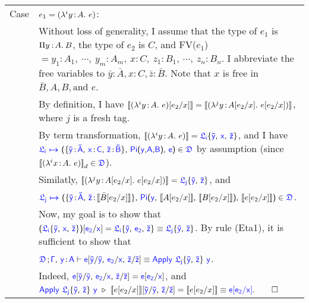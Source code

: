 \begin{longtable}{p{0.05\linewidth} p{0.95\linewidth}}
Case & $e_1 = (\lambda^{i}y\hspace{0.5mm}{:}\hspace{0.5mm} A.\ e)$:\\
& Without loss of generality, I assume that the type of $e_1$ is $\Pi y\mkern1.5mu{\hspace{0.5mm}{:}\hspace{0.5mm}} A.\hspace{0.8mm}B$, the type of $e_2$ is $C$, and FV($e_1$) $ =y_1 : A_1,\ \cdots,\ y_m : A_m,\ x : C,\ z_1 : B_1,\ \cdots,\ z_n : B_n$.
I abbreviate the free variables to $\bar{y} : \bar{A}, x : C , \bar{z} : \bar{B}$. Note that $x$ is free in $\bar{B}, A, B, \text{and } e$.
\\
& By definition, I have ${[\![ (\lambda^{i}y\hspace{0.5mm}{:}\hspace{0.5mm} A.\ e)[e_2\slash x] ]\!]} = {[\![ (\lambda^{j}y\hspace{0.5mm}{:}\hspace{0.5mm} A[e_2\slash x].\ e[e_2\slash x]) ]\!]}$, where $j$  is a fresh tag.\\
& By term transformation, $\bbracket{(\lami{i}{y}{A}{e})} = 
\target{\flabel_i}\{\target{\bar{y}} \sfcomma \target{x} \sfcomma \target{\bar{z}}\}$, and I have 
$\itemdef{\target{\flabel_i}}
{\itemtype{\bar{y}}{\bar{A}} \sfcomma \itemtype{x}{C} \sfcomma \itemtype{\bar{z}}{\bar{B}}}
{\targetpi{y}{A}{B}}{\target{e}} \in \target{\fdef}$ by assumption (since $\bbracket{(\lami{i}{x}{A}{e})}_d \in \target{\fdef}$).\\
& Similatly, $\bbracket{(\lami{j}{y}{A\sub{e_2}{x}}{e\sub{e_2}{x}})} = 
\target{\flabel_j}\{\target{\bar{y}} \sfcomma \target{\bar{z}}\}$, and\\ 
&  $\itemdef{\target{\flabel_j}}
{\itemtype{\bar{y}}{\bar{A}} \sfcomma \target{\bar{z}} \goodcolon \bbracket{\bar{B}\sub{e_2}{x}}}
{\target{Pi} \sfpl \target{y} \sfcomma \bbracket{{A}\sub{e_2}{x}} \sfcomma \bbracket{{B}\sub{e_2}{x}} \sfpr}
{\bbracket{{e}\sub{e_2}{x}}} \in \target{\fdef}$.\\
& Now, my goal is to show that 
$\sfpl \target{\flabel_i}\{\target{\bar{y}} \sfcomma \target{x} \sfcomma \target{\bar{z}}\} \sfpr \sub{\target{e_2}}{\target{x}} = \target{\flabel_i}\{\target{\bar{y}} \sfcomma \target{e_2} \sfcomma \target{\bar{z}}\} \equiv
\target{\flabel_j}\{\target{\bar{y}} \sfcomma \target{\bar{z}}\}$. By rule (Eta1), it is sufficient to show that\\
& $\targetcon \sfcomma \target{y} \goodcolon \target{A} \vdash 
\target{e}[\target{\bar{y}}\slash\target{\bar{y}} \sfcomma \target{e_2}\slash\target{x} \sfcomma \target{\bar{z}}\slash\target{\bar{z}}]
\equiv \target{Apply}\ \target{\flabel_j}\{\target{\bar{y}} \sfcomma \target{\bar{z}}\} \ \target{y}$.\\
& Indeed, $\target{e}[\target{\bar{y}}\slash\target{\bar{y}} \sfcomma \target{e_2}\slash\target{x} \sfcomma \target{\bar{z}}\slash\target{\bar{z}}] = \target{e}\sub{\target{e_2}}{\target{x}}$, and\\
& $\target{Apply}\ \target{\flabel_j}\{\target{\bar{y}} \sfcomma \target{\bar{z}}\} \ \target{y}\ 
\triangleright\  \bbracket{{e}\sub{e_2}{x}}[\target{\bar{y}}\slash\target{\bar{y}} \sfcomma \target{\bar{z}}\slash\target{\bar{z}}] = \bbracket{{e}\sub{e_2}{x}} \equiv \target{{e}\sub{\target{e_2}}{\target{x}}}. \qed
$
\end{longtable}

